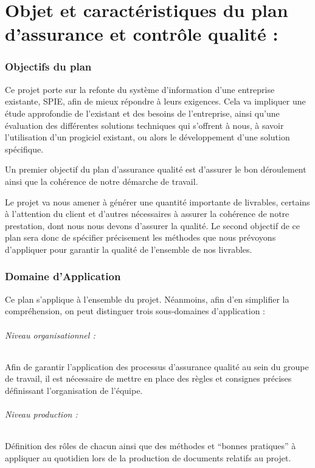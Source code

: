 \part{Objet et caractéristiques du plan d'assurance et contrôle qualité :}

\section{Objectifs du plan}

Ce projet porte sur la refonte du système d'information d'une entreprise existante, SPIE, afin de mieux répondre à leurs exigences. Cela va impliquer une étude approfondie de l'existant et des besoins de l'entreprise, ainsi qu'une évaluation des différentes solutions techniques qui s'offrent à nous, à savoir l'utilisation d'un progiciel existant, ou alors le développement d'une solution spécifique.

Un premier objectif du plan d'assurance qualité est d'assurer le bon déroulement ainsi que la cohérence de notre démarche de travail.

Le projet va nous amener à générer une quantité importante de livrables, certains à l'attention du client et d'autres nécessaires à assurer la cohérence de notre prestation, dont nous nous devons d'assurer la qualité. Le second objectif de ce plan sera donc de spécifier précisement les méthodes que nous prévoyons d'appliquer pour garantir la qualité de l'ensemble de nos livrables.

\section{Domaine d'Application}

Ce plan s'applique à l'ensemble du projet. Néanmoins, afin d'en simplifier la compréhension, on peut distinguer trois sous-domaines d'application :

\paragraph{Niveau organisationnel :} Afin de garantir l'application des processus d'assurance qualité au sein du groupe de travail, il est nécessaire de mettre en place des règles et consignes précises définissant l'organisation de l'équipe.

\paragraph{Niveau production :} Définition des rôles de chacun ainsi que des méthodes et ``bonnes pratiques'' à appliquer au quotidien lors de la production de documents relatifs au projet.

